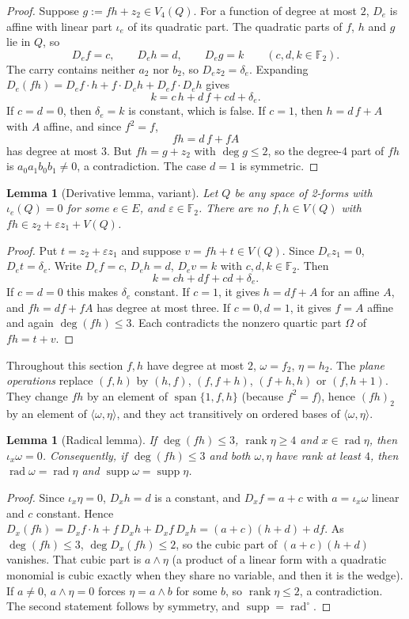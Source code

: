 \documentclass[11pt,a4paper]{article}
\theoremstyle{plain}
\newtheorem{lemma}[theorem]{Lemma}
\theoremstyle{remark}
\newcommand{\F}{\mathbb F_2}
\newcommand{\Span}{\operatorname{span}}
\newcommand{\supp}{\operatorname{supp}}
\newcommand{\rad}{\operatorname{rad}}
\newcommand{\rk}{\operatorname{rank}}
\begin{document}
\begin{proof}
Suppose $g:=fh+z_2\in V_4(Q)$. For a function of degree at most $2$, $D_e$ is affine with linear part $\iota_e$ of its quadratic part. The quadratic parts of $f$, $h$ and $g$ lie in $Q$, so
\[
  D_ef=c,\qquad D_eh=d,\qquad D_eg=k\qquad(c,d,k\in\F).
\]
The carry contains neither $a_2$ nor $b_2$, so $D_ez_2=\delta_e$. Expanding $D_e(fh)=D_ef\cdot h+f\cdot D_eh+D_ef\cdot D_eh$ gives
\[
  k=c\,h+d\,f+cd+\delta_e .
\]
If $c=d=0$, then $\delta_e=k$ is constant, which is false. If $c=1$, then $h=d\,f+A$ with $A$ affine, and since $f^2=f$,
\[
  fh=d\,f+f A
\]
has degree at most $3$. But $fh=g+z_2$ with $\deg g\le2$, so the degree-4 part of $fh$ is $a_0a_1b_0b_1\neq0$, a contradiction. The case $d=1$ is symmetric.
\end{proof}
\begin{lemma}[Derivative lemma, variant]\label{l3:lem:deriv}
Let $Q$ be any space of 2-forms with $\iota_e(Q)=0$ for some $e\in E$, and $\varepsilon\in\F$. There are no $f,h\in V(Q)$ with $fh\in z_2+\varepsilon z_1+V(Q)$.
\end{lemma}
\begin{proof}
Put $t=z_2+\varepsilon z_1$ and suppose $v=fh+t\in V(Q)$. Since $D_ez_1=0$, $D_et=\delta_e$. Write $D_ef=c$, $D_eh=d$, $D_ev=k$ with $c,d,k\in\F$. Then
\[
k=ch+df+cd+\delta_e.
\]
If $c=d=0$ this makes $\delta_e$ constant. If $c=1$, it gives $h=df+A$ for an affine $A$, and $fh=df+fA$ has degree at most three. If $c=0,d=1$, it gives $f=A$ affine and again $\deg(fh)\le3$. Each contradicts the nonzero quartic part $\Omega$ of $fh=t+v$.
\end{proof}


Throughout this section $f,h$ have degree at most $2$, $\omega=f_2$, $\eta=h_2$. The \emph{plane operations} replace $(f,h)$ by $(h,f)$, $(f,f+h)$, $(f+h,h)$ or $(f,h+1)$. They change $fh$ by an element of $\Span\{1,f,h\}$ (because $f^2=f$), hence $(fh)_2$ by an element of $\langle\omega,\eta\rangle$, and they act transitively on ordered bases of $\langle\omega,\eta\rangle$.

\begin{lemma}[Radical lemma]\label{l3:lem:rad}
If $\deg(fh)\le3$, $\rk\eta\ge4$ and $x\in\rad\eta$, then $\iota_x\omega=0$. Consequently, if $\deg(fh)\le 3$ and both $\omega,\eta$ have rank at least $4$, then $\rad\omega=\rad\eta$ and $\supp\omega=\supp\eta$.
\end{lemma}

\begin{proof}
Since $\iota_x\eta=0$, $D_xh=d$ is a constant, and $D_xf=a+c$ with $a=\iota_x\omega$ linear and $c$ constant. Hence $D_x(fh)=D_xf\cdot h+f\,D_xh+D_xf\,D_xh=(a+c)(h+d)+d f$. As $\deg(fh)\le3$, $\deg D_x(fh)\le2$, so the cubic part of $(a+c)(h+d)$ vanishes. That cubic part is $a\wedge\eta$ (a product of a linear form with a quadratic monomial is cubic exactly when they share no variable, and then it is the wedge). If $a\ne0$, $a\wedge\eta=0$ forces $\eta=a\wedge b$ for some $b$, so $\rk\eta\le2$, a contradiction. The second statement follows by symmetry, and $\supp=\rad^{\circ}$.
\end{proof}
\end{document}
